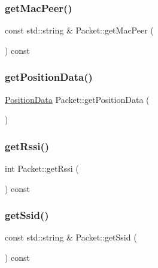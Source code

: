 \mbox{\label{class_packet_ae56fcb3dd448b891279b46795d3b25c4}} 
\subsubsection{\texorpdfstring{get\+Mac\+Peer()}{getMacPeer()}}
{\footnotesize\ttfamily const std\+::string \& Packet\+::get\+Mac\+Peer (\begin{DoxyParamCaption}{ }\end{DoxyParamCaption}) const}

\mbox{\label{class_packet_afd40ba0c05a6199c81b2ff59eb594b1c}} 
\subsubsection{\texorpdfstring{get\+Position\+Data()}{getPositionData()}}
{\footnotesize\ttfamily \hyperlink{class_position_data}{Position\+Data} Packet\+::get\+Position\+Data (\begin{DoxyParamCaption}{ }\end{DoxyParamCaption})}

\mbox{\label{class_packet_aa2eb8485b8edd547f2c37710b68e8876}} 
\subsubsection{\texorpdfstring{get\+Rssi()}{getRssi()}}
{\footnotesize\ttfamily int Packet\+::get\+Rssi (\begin{DoxyParamCaption}{ }\end{DoxyParamCaption}) const}

\mbox{\label{class_packet_a32b7a7fe06e562dd126de88ab0da517d}} 
\subsubsection{\texorpdfstring{get\+Ssid()}{getSsid()}}
{\footnotesize\ttfamily const std\+::string \& Packet\+::get\+Ssid (\begin{DoxyParamCaption}{ }\end{DoxyParamCaption}) const}

